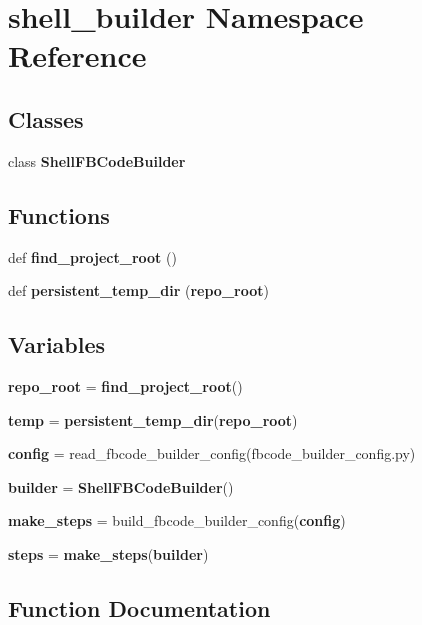 \section{shell\+\_\+builder Namespace Reference}
\label{namespaceshell__builder}
\subsection*{Classes}
\begin{DoxyCompactItemize}
\item 
class {\bf Shell\+F\+B\+Code\+Builder}
\end{DoxyCompactItemize}
\subsection*{Functions}
\begin{DoxyCompactItemize}
\item 
def {\bf find\+\_\+project\+\_\+root} ()
\item 
def {\bf persistent\+\_\+temp\+\_\+dir} ({\bf repo\+\_\+root})
\end{DoxyCompactItemize}
\subsection*{Variables}
\begin{DoxyCompactItemize}
\item 
{\bf repo\+\_\+root} = {\bf find\+\_\+project\+\_\+root}()
\item 
{\bf temp} = {\bf persistent\+\_\+temp\+\_\+dir}({\bf repo\+\_\+root})
\item 
{\bf config} = read\+\_\+fbcode\+\_\+builder\+\_\+config(\textquotesingle{}fbcode\+\_\+builder\+\_\+config.\+py\textquotesingle{})
\item 
{\bf builder} = {\bf Shell\+F\+B\+Code\+Builder}()
\item 
{\bf make\+\_\+steps} = build\+\_\+fbcode\+\_\+builder\+\_\+config({\bf config})
\item 
{\bf steps} = {\bf make\+\_\+steps}({\bf builder})
\end{DoxyCompactItemize}


\subsection{Function Documentation}
